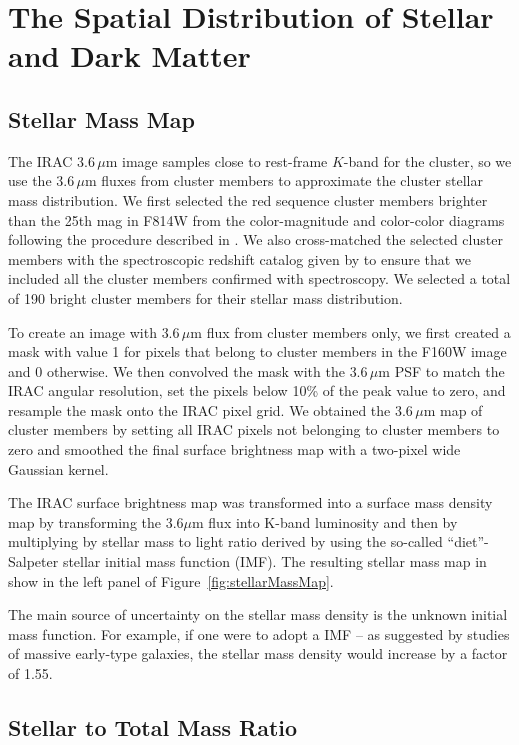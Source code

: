 \section{The Spatial Distribution of Stellar and Dark Matter}

\subsection{Stellar Mass Map}

The \spitzer IRAC $3.6\,\mu$m image samples close to rest-frame
$K$-band for the cluster, so we use the $3.6\,\mu$m fluxes from
cluster members to approximate the cluster stellar mass
distribution. We first selected the red sequence cluster members
brighter than the 25th mag in F814W from the color-magnitude and
color-color diagrams following the procedure described in
\cite{2014MNRAS.444..268R}. We also cross-matched the selected cluster
members with the spectroscopic redshift catalog given by
\citet{Owers:2011ez} to ensure that we included all the cluster
members confirmed with spectroscopy.  We selected a total of 190
bright cluster members for their stellar mass distribution.

To create an image with $3.6\,\mu$m flux from cluster members only, we
first created a mask with value 1 for pixels that belong to cluster
members in the F160W image and 0 otherwise. We then convolved the mask
with the $3.6\,\mu$m PSF to match the IRAC angular resolution, set the
pixels below 10\% of the peak value to zero, and resample the mask
onto the IRAC pixel grid. We obtained the $3.6\,\mu$m map of cluster
members by setting all IRAC pixels not belonging to cluster members to
zero and smoothed the final surface brightness map with a two-pixel
wide Gaussian kernel.

The IRAC surface brightness map was transformed into a surface mass
density map by transforming the 3.6$\mu$m flux into K-band luminosity
and then by multiplying by stellar mass to light ratio derived by
\cite{B+d01} using the so-called ``diet''-Salpeter stellar initial 
mass function (IMF). The resulting stellar mass map in show in the
left panel of Figure~\ref{fig:stellarMassMap}.

The main source of uncertainty on the stellar mass density is the
unknown initial mass function. For example, if one were to adopt a
\cite{Sal55} IMF -- as suggested by studies of massive early-type
galaxies, the stellar mass density would increase by a factor of 1.55.

\subsection{Stellar to Total Mass Ratio}

